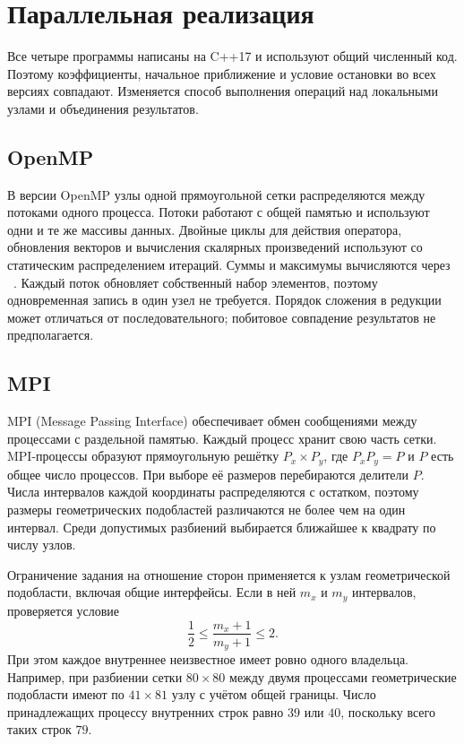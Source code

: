 \section{Параллельная реализация}

Все четыре программы написаны на C++17 и используют общий численный код.
Поэтому коэффициенты, начальное приближение и условие остановки во всех версиях совпадают.
Изменяется способ выполнения операций над локальными узлами и объединения результатов.

\subsection{OpenMP}

В версии OpenMP узлы одной прямоугольной сетки распределяются между потоками одного процесса.
Потоки работают с общей памятью и используют одни и те же массивы данных.
Двойные циклы для действия оператора, обновления векторов и вычисления скалярных произведений используют  со статическим распределением итераций.
Суммы и максимумы вычисляются через ~\cite{omp}.
Каждый поток обновляет собственный набор элементов, поэтому одновременная запись в один узел не требуется.
Порядок сложения в редукции может отличаться от последовательного; побитовое совпадение результатов не предполагается.

\subsection{MPI}

MPI (Message Passing Interface) обеспечивает обмен сообщениями между процессами с раздельной памятью.
Каждый процесс хранит свою часть сетки.
MPI-процессы образуют прямоугольную решётку $P_x\times P_y$, где $P_xP_y=P$ и $P$ есть общее число процессов.
При выборе её размеров перебираются делители $P$.
Числа интервалов каждой координаты распределяются с остатком, поэтому размеры геометрических подобластей различаются не более чем на один интервал.
Среди допустимых разбиений выбирается ближайшее к квадрату по числу узлов.

Ограничение задания на отношение сторон применяется к узлам геометрической подобласти, включая общие интерфейсы.
Если в ней $m_x$ и $m_y$ интервалов, проверяется условие
\begin{equation}
    \frac12\leq\frac{m_x+1}{m_y+1}\leq2.
\end{equation}
При этом каждое внутреннее неизвестное имеет ровно одного владельца.
Например, при разбиении сетки $80\times80$ между двумя процессами геометрические подобласти имеют по $41\times81$ узлу с учётом общей границы.
Число принадлежащих процессу внутренних строк равно $39$ или $40$, поскольку всего таких строк $79$.

